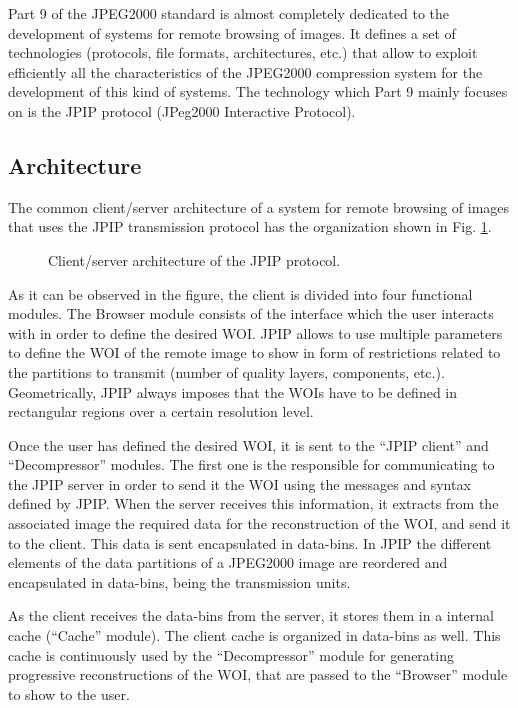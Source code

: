 
Part 9 of the JPEG2000 standard is almost
completely dedicated to the development of systems for
remote browsing of images. It defines a set of technologies
(protocols, file formats, architectures, etc.) that allow
to exploit efficiently all the characteristics of the JPEG2000
compression system for the development of this
kind of systems. The technology which Part 9 mainly focuses on is 
the JPIP protocol (JPeg2000 Interactive Protocol). 

\subsection{Architecture}

The common client/server architecture of a system for remote browsing of
images that uses the JPIP transmission protocol has the organization
shown in Fig. \ref{fig:jpip}.

\begin{figure}
\resizebox{\textwidth}{!}{

}
\caption{Client/server architecture of the JPIP protocol.}
\label{fig:jpip}
\end{figure}

As it can be observed in the figure, the client is divided
into four functional modules. The Browser module consists of
the interface which the user interacts with in order to
define the desired WOI. JPIP allows to use multiple parameters
to define the WOI of the remote image to show in form of 
restrictions related to the partitions to transmit (number 
of quality layers, components, etc.). Geometrically,
JPIP always imposes that the WOIs have to be defined in
rectangular regions over a certain resolution level.

Once the user has defined the desired WOI, it is sent to the
``JPIP client'' and ``Decompressor'' modules. The first one is
the responsible for communicating to the JPIP server 
in order to send it the WOI using the messages and syntax
defined by JPIP. When the server receives this information,
it extracts from the associated image the required data for
the reconstruction of the WOI, and send it to the client.
This data is sent encapsulated in data-bins. In JPIP the
different elements of the data partitions of a JPEG2000 image
are reordered and encapsulated in data-bins, being the
transmission units.

As the client receives the data-bins from the server, it stores them
in a internal cache (``Cache'' module). The client cache is organized 
in data-bins as well. This cache is continuously used by the ``Decompressor''
module for generating progressive reconstructions of the WOI, 
that are passed to the ``Browser'' module to show to the user.

